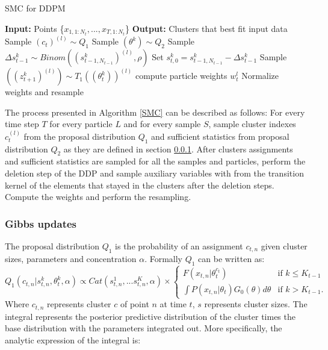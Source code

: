\documentclass[twoside,hidelinks]{article}
\begin{document}
\begin{algorithm}[ht!]
  \caption{SMC for DDPM}\label{SMC}
  \begin{algorithmic}[1]
	\State \textbf{Input:} Points \{$x_{1,1:N_t}, ..., x_{T,1:N_t}$\}
	\State \textbf{Output:} Clusters that best fit input data
								\State Sample $(c_t)^{(l)} \sim Q_1$  
								\State Sample $(\theta^k ) \sim Q_2$
						    \EndFor		
			   \State Sample $\Delta s_{t-1}^k \sim Binom( (s_{t-1,N_{t-1}}^k)^{(l)}, \rho) $ 
		       \State Set $s_{t,0}^{k} = s_{t-1,N_{t-1}}^{k} -\Delta s_{t-1}^k$
   		       \State Sample $( (z_{t+1}^k)^{(l)} ) \sim T_1((\theta_t^k))^{(l)} $
		    \EndFor
		 	\State compute particle weights $w_t^l$
		    \EndFor
    \State Normalize weights and resample
    \EndFor
  \end{algorithmic}
\end{algorithm}

The process  presented in Algorithm \ref{SMC} can be described as follows:
For every time step $T$ for every particle $L$ and for every sample $S$, sample cluster indexes $c_t^{(l)}$ from the proposal distribution $Q_1$ and sufficient statistics from proposal distribution $Q_2$ as they are defined in section \ref{gibbsUpd}. After clusters assignments and sufficient statistics are sampled for all the samples and particles, perform the deletion step of the DDP and sample auxiliary variables with from the transition kernel of the elements that stayed in the clusters after the deletion steps. Compute the weights and perform the resampling. 

\subsubsection{Gibbs updates}
\label{gibbsUpd}
The proposal distribution $Q_1$ is the probability of an assignment $c_{t,n}$ given cluster sizes, parameters and concentration $\alpha$. Formally $Q_1$ can be written as:
\begin{equation} \label{Gibbs}
 Q_1(c_{t,n} | s_{t,n}^k, \theta_t^k, \alpha) \propto Cat( s_{t,n}^1,...s_{t,n}^K, \alpha ) \times
 	\begin{cases} 
 	F(x_{t,n} | \theta_t^{c_t} )  &\mbox{if } k \leq K_{t-1} \\
 	\int P(x_{t,n} | \theta_t )G_0(\theta) d\theta & \mbox{if } k > K_{t-1}. \end{cases}
\end{equation}
Where $c_{t,n}$ represents cluster $c$ of point $n$ at time $t$, $s$ represents cluster sizes. The integral represents the posterior predictive distribution of the cluster times the base distribution with the parameters integrated out. More specifically, the analytic expression of the integral is:
\end{document}
